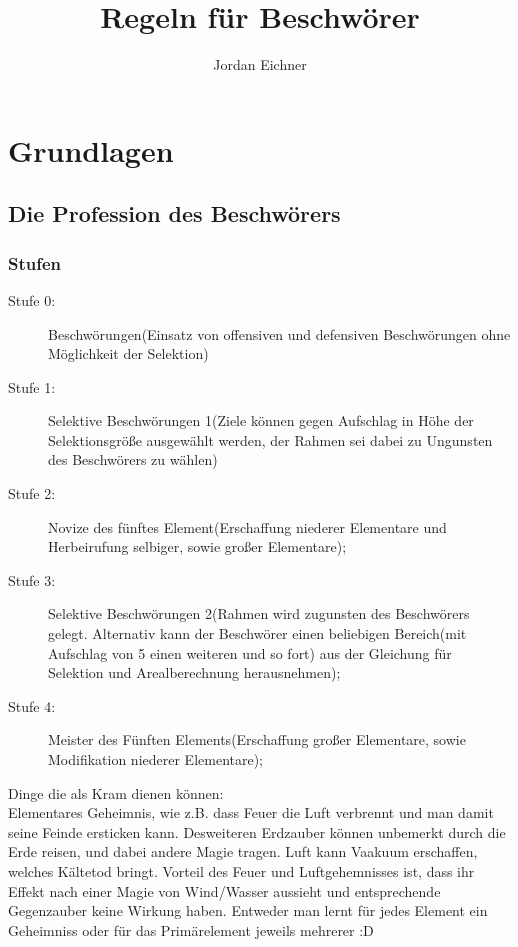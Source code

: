 \documentclass[a4paper,12pt,oneside]{book}
\title{Regeln für Beschwörer}
\author{Jordan Eichner}
\date{}
\begin{document}
\maketitle
\tableofcontents

\part{Grundlagen}

\chapter{Die Profession des Beschwörers}

\section{Stufen}
\begin{description}
\item[Stufe 0:] Beschwörungen(Einsatz von offensiven und defensiven Beschwörungen ohne Möglichkeit der Selektion)
\item[Stufe 1:] Selektive Beschwörungen 1(Ziele können gegen Aufschlag in Höhe der Selektionsgröße ausgewählt werden, der Rahmen sei dabei zu Ungunsten des Beschwörers zu wählen)
\item[Stufe 2:] Novize des fünftes Element(Erschaffung niederer Elementare und Herbeirufung selbiger, sowie großer Elementare);
\item[Stufe 3:] Selektive Beschwörungen 2(Rahmen wird zugunsten des Beschwörers gelegt. Alternativ kann der Beschwörer einen beliebigen Bereich(mit Aufschlag von 5 einen weiteren und so fort) aus der Gleichung für Selektion und Arealberechnung herausnehmen);
\item[Stufe 4:] Meister des Fünften Elements(Erschaffung großer Elementare, sowie Modifikation niederer Elementare);
\end{description}

Dinge die als Kram dienen können:
\\Elementares Geheimnis, wie z.B. dass Feuer die Luft verbrennt und man damit seine Feinde ersticken kann.
Desweiteren Erdzauber können unbemerkt durch die Erde reisen, und dabei andere Magie tragen. Luft kann Vaakuum erschaffen, welches Kältetod bringt. Vorteil des Feuer und Luftgehemnisses ist, dass ihr Effekt nach einer Magie von Wind/Wasser aussieht und entsprechende Gegenzauber keine Wirkung haben. Entweder man lernt für jedes Element ein Geheimniss oder für das Primärelement jeweils mehrerer :D
\end{document}
